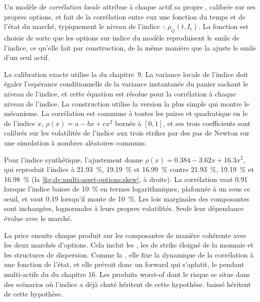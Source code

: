 \begin{definition}\label{def:dv:multi-asset-options:local}
Un modèle de \emph{corrélation locale} attribue à chaque actif sa propre , calibrée sur ses propres
options, et fait de la corrélation entre eux une fonction du temps et de l'état du marché, typiquement le niveau de l'indice~:
$\rho_{ij}(t,I_t)$. La fonction est choisie de sorte que les options sur indice du modèle reproduisent le smile de l'indice, ce qu'elle fait par
construction, de la même manière que la  ajuste le smile d'un seul actif.
\end{definition}

La calibration exacte utilise la  du chapitre~9. La variance locale de l'indice doit égaler l'espérance conditionnelle
de la variance instantanée du panier sachant le niveau de l'indice, et cette équation est résolue pour la
corrélation à chaque niveau de l'indice. La construction utilise la version la plus simple qui montre le mécanisme. La corrélation est
commune à toutes les paires et quadratique en le  de l'indice $x$, $\rho(x)=a-bx+cx^2$ bornée à $[0,1]$, et ses trois
coefficients sont calibrés sur les volatilités de l'indice aux trois strikes par des pas de Newton sur une simulation à nombres aléatoires
communs.

\begin{example}\label{ex:dv:multi-asset-options:lc}
Pour l'indice synthétique, l'ajustement donne $\rho(x)=0.384-3.62x+16.3x^2$, qui reproduit l'indice à 21.93~\%, 19.19~\% et
16.99~\% contre 21.93~\%, 19.19~\% et 16.98~\% (la \cref{fig:dv:multi-asset-options:skew}, à droite). La corrélation vaut 0.91 lorsque
l'indice baisse de 10~\% en termes logarithmiques, plafonnée à un sous ce seuil, et vaut 0.19 lorsqu'il monte de 10~\%. Les lois marginales des composantes sont
inchangées, lognormales à leurs propres volatilités. Seule leur dépendance évolue avec le marché.
\end{example}

La  price ensuite chaque produit sur les composantes de manière cohérente avec les deux marchés d'options. Cela inclut les ,
les  de strike éloigné de la monnaie et les structures de dispersion. Comme la , elle fixe la dynamique de
la corrélation à une fonction de l'état, et elle prévoit donc un  forward qui s'aplatit, le pendant multi-actifs
du  du chapitre 16. Les produits worst-of dont le risque se situe dans des scénarios où l'indice a déjà chuté héritent de cette hypothèse.
baissé héritent de cette hypothèse.

